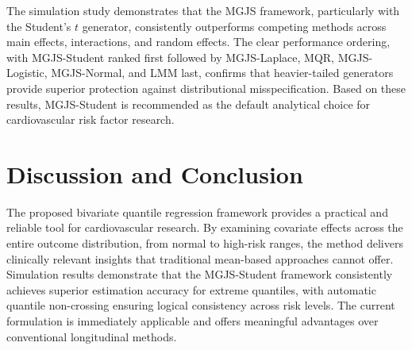 \documentclass[twoside]{article}
\begin{document}
The simulation study demonstrates that the MGJS framework, particularly with the Student's $t$ generator, consistently outperforms competing methods across main effects, interactions, and random effects. The clear performance ordering, with MGJS-Student ranked first followed by MGJS-Laplace, MQR, MGJS-Logistic, MGJS-Normal, and LMM last, confirms that heavier-tailed generators provide superior protection against distributional misspecification. Based on these results, MGJS-Student is recommended as the default analytical choice for cardiovascular risk factor research.

\section{Discussion and Conclusion}   \label{sec6}
The proposed bivariate quantile regression framework provides a practical and reliable tool for cardiovascular research. By examining covariate effects across the entire outcome distribution, from normal to high-risk ranges, the method delivers clinically relevant insights that traditional mean-based approaches cannot offer. Simulation results demonstrate that the MGJS-Student framework consistently achieves superior estimation accuracy for extreme quantiles, with automatic quantile non-crossing ensuring logical consistency across risk levels. The current formulation is immediately applicable and offers meaningful advantages over conventional longitudinal methods.
\end{document}
